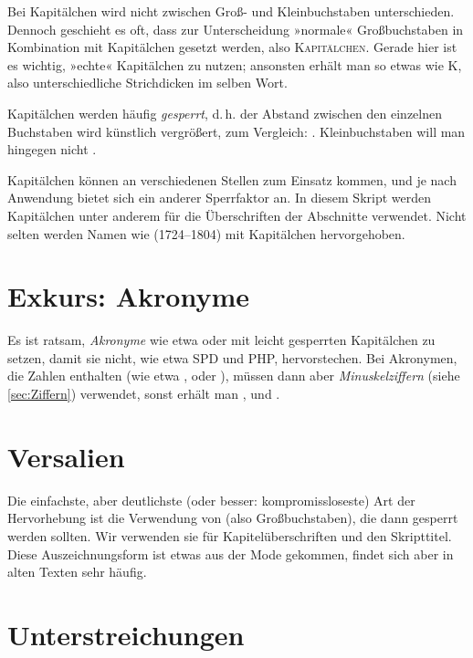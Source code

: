 Bei Kapitälchen wird nicht zwischen Groß- und Kleinbuchstaben
unterschieden. Dennoch geschieht es oft, dass zur Unterscheidung »normale«
Großbuchstaben in Kombination mit Kapitälchen gesetzt werden, also
\textsc{Kapitälchen}. Gerade hier ist es wichtig, »echte« Kapitälchen zu
nutzen; ansonsten erhält man so etwas wie K, also
unterschiedliche Strichdicken im selben Wort.

Kapitälchen werden häufig
\emph{gesperrt}, d.\,h. der Abstand zwischen den einzelnen Buchstaben wird
künstlich vergrößert, zum Vergleich:
. Kleinbuchstaben will man hingegen nicht
.

Kapitälchen können an verschiedenen Stellen zum Einsatz kommen, und je nach
Anwendung bietet sich ein anderer Sperrfaktor an. In diesem Skript werden
Kapitälchen unter anderem für die Überschriften der Abschnitte verwendet. Nicht
selten werden Namen wie  (1724–1804) mit
Kapitälchen hervorgehoben.

\section{Exkurs: Akronyme}

Es ist ratsam, \emph{Akronyme} wie etwa  oder  mit leicht
gesperrten Kapitälchen zu setzen, damit sie nicht, wie etwa SPD und PHP,
hervorstechen. Bei Akronymen, die Zahlen enthalten (wie etwa ,
 oder ), müssen dann aber
\emph{Minuskelziffern} (siehe \cref{sec:Ziffern}) verwendet, sonst erhält man
,  und
.

\section{Versalien}

Die einfachste, aber deutlichste (oder besser: kompromissloseste) Art
der Hervorhebung ist die Verwendung von  (also
Großbuchstaben), die dann gesperrt werden sollten. Wir verwenden sie für
Kapitelüberschriften und den Skripttitel.  Diese Auszeichnungsform ist etwas aus
der Mode gekommen, findet sich aber in alten Texten sehr häufig.

\section{Unterstreichungen}

